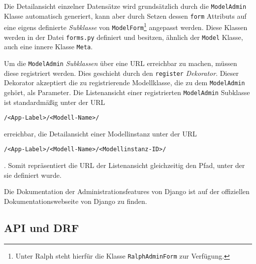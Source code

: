 Die Detailansicht einzelner Datensätze wird grundsätzlich durch die
\texttt{ModelAdmin} Klasse automatisch generiert, kann aber durch Setzen
dessen \texttt{form} Attributs auf eine eigens definierte
\emph{Subklasse}
von \texttt{ModelForm}\footnote{Unter Ralph steht hierfür die Klasse
  \texttt{RalphAdminForm} zur Verfügung.} angepasst werden. Diese
Klassen werden in der Datei \texttt{forms.py} definiert und besitzen,
ähnlich der \texttt{Model} Klasse, auch eine innere Klasse
\texttt{Meta}.

Um die \texttt{ModelAdmin}
\emph{Subklassen}
über eine URL erreichbar zu machen, müssen diese registriert werden.
Dies geschieht durch den \texttt{register}
\emph{Dekorator}.
Dieser Dekorator akzeptiert die zu registrierende Modellklasse, die zu
dem \texttt{ModelAdmin} gehört, als Parameter. Die Listenansicht einer
registrierten \texttt{ModelAdmin} Subklasse ist standardmäßig unter der
URL

\begin{verbatim}
/<App-Label>/<Modell-Name>/
\end{verbatim}

erreichbar, die Detailansicht einer Modellinstanz unter der URL

\begin{verbatim}
/<App-Label>/<Modell-Name>/<Modellinstanz-ID>/
\end{verbatim}

. Somit repräsentiert die URL der Listenansicht gleichzeitig den Pfad,
unter der sie definiert wurde.

Die Dokumentation der Administrationsfeatures von Django ist auf der
offiziellen Dokumentationswebseite von Django \cite{django-doku-admin}
zu finden.

\hypertarget{api-und-drf}{%
\subsection{API und DRF}\label{api-und-drf}}


